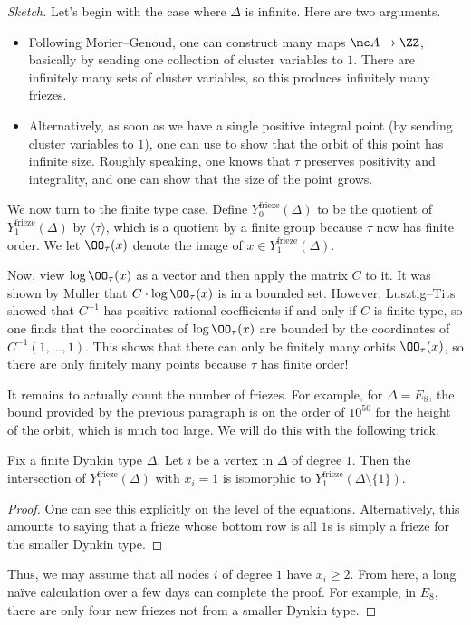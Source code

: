 \documentclass[../notes.tex]{subfiles}
\begin{document}
\begin{proof}[Sketch]
	Let's begin with the case where $\Delta$ is infinite. Here are two arguments.
	\begin{itemize}
		\item Following Morier--Genoud, one can construct many maps $\mc A\to\ZZ$, basically by sending one collection of cluster variables to $1$. There are infinitely many sets of cluster variables, so this produces infinitely many friezes.
		\item Alternatively, as soon as we have a single positive integral point (by sending cluster variables to $1$), one can use  to show that the orbit of this point has infinite size. Roughly speaking, one knows that $\tau$ preserves positivity and integrality, and one can show that the size of the point grows.
	\end{itemize}
	We now turn to the finite type case. Define $Y_0^{\mathrm{frieze}}(\Delta)$ to be the quotient of $Y_1^{\mathrm{frieze}}(\Delta)$ by $\langle\tau\rangle$, which is a quotient by a finite group because $\tau$ now has finite order. We let $\OO_\tau(x)$ denote the image of $x\in Y_1^{\mathrm{frieze}}(\Delta)$.

	Now, view $\log\OO_\tau(x)$ as a vector and then apply the matrix $C$ to it. It was shown by Muller that $C\cdot\log\OO_\tau(x)$ is in a bounded set. However, Lusztig--Tits showed that $C^{-1}$ has positive rational coefficients if and only if $C$ is finite type, so one finds that the coordinates of $\log\OO_\tau(x)$ are bounded by the coordinates of $C^{-1}(1,\ldots,1)$. This shows that there can only be finitely many orbits $\OO_\tau(x)$, so there are only finitely many points because $\tau$ has finite order!

	It remains to actually count the number of friezes. For example, for $\Delta=E_8$, the bound provided by the previous paragraph is on the order of $10^{50}$ for the height of the orbit, which is much too large. We will do this with the following trick.
	\begin{lemma}
		Fix a finite Dynkin type $\Delta$. Let $i$ be a vertex in $\Delta$ of degree $1$. Then the intersection of $Y_1^{\mathrm{frieze}}(\Delta)$ with $x_i=1$ is isomorphic to $Y_1^{\mathrm{frieze}}(\Delta\setminus\{1\})$.
	\end{lemma}
	\begin{proof}
		One can see this explicitly on the level of the equations. Alternatively, this amounts to saying that a frieze whose bottom row is all $1$s is simply a frieze for the smaller Dynkin type.
	\end{proof}
	Thus, we may assume that all nodes $i$ of degree $1$ have $x_i\ge2$. From here, a long na\"ive calculation over a few days can complete the proof. For example, in $E_8$, there are only four new friezes not from a smaller Dynkin type.
\end{proof}
\end{document}
